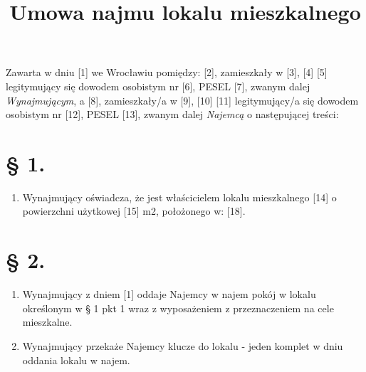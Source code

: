 \documentclass[a4paper,11pt, notitlepage]{article}
\title{Umowa najmu lokalu mieszkalnego}
\author{}
\date{}
\begin{document}
\maketitle

Zawarta w dniu [1] we Wrocławiu pomiędzy:
[2], zamieszkały w [3], [4] [5] legitymujący się dowodem osobistym nr [6], PESEL [7], zwanym dalej \textit{Wynajmującym}, a
[8], zamieszkały/a w [9], [10] [11] legitymujący/a się dowodem osobistym nr [12], PESEL [13], zwanym dalej \textit{Najemcą} o następującej treści:
\section*{§ 1.}
    \begin{enumerate}
        \item Wynajmujący oświadcza, że jest właścicielem lokalu mieszkalnego [14] o powierzchni użytkowej [15] m2, położonego w: [18].
    \end{enumerate}

\section*{§ 2.}
    \begin{enumerate}
     \item Wynajmujący z dniem [1] oddaje Najemcy w najem pokój w lokalu określonym w § 1 pkt 1 wraz z wyposażeniem z przeznaczeniem na cele mieszkalne.
 	
    \item Wynajmujący przekaże Najemcy klucze do lokalu - jeden komplet w dniu oddania lokalu w najem. 
    \end{enumerate}
\end{document}
